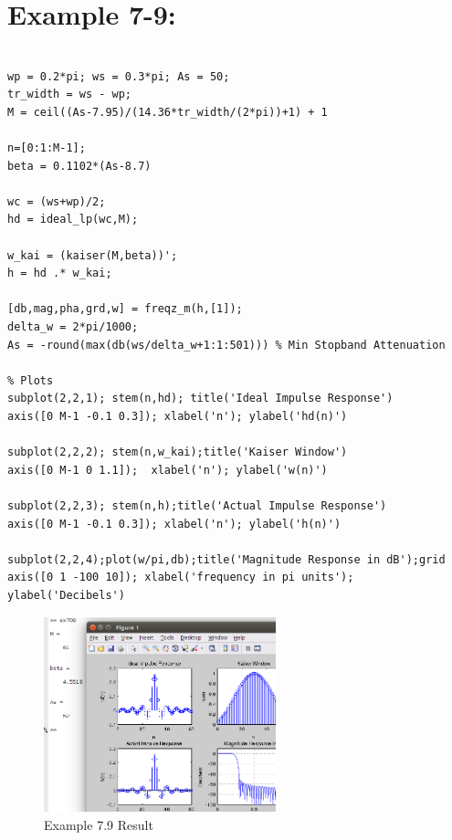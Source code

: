 \documentclass[11pt
  , a4paper
  , article
  , oneside
]{memoir}
\begin{document}
\chapter{Example 7-9:}
\begin{lstlisting}[style=termstyle]
% Example 7.9

wp = 0.2*pi; ws = 0.3*pi; As = 50;
tr_width = ws - wp;
M = ceil((As-7.95)/(14.36*tr_width/(2*pi))+1) + 1

n=[0:1:M-1];
beta = 0.1102*(As-8.7)

wc = (ws+wp)/2;
hd = ideal_lp(wc,M);

w_kai = (kaiser(M,beta))';
h = hd .* w_kai;

[db,mag,pha,grd,w] = freqz_m(h,[1]);
delta_w = 2*pi/1000;
As = -round(max(db(ws/delta_w+1:1:501))) % Min Stopband Attenuation

% Plots
subplot(2,2,1); stem(n,hd); title('Ideal Impulse Response')
axis([0 M-1 -0.1 0.3]); xlabel('n'); ylabel('hd(n)')

subplot(2,2,2); stem(n,w_kai);title('Kaiser Window')
axis([0 M-1 0 1.1]);  xlabel('n'); ylabel('w(n)')

subplot(2,2,3); stem(n,h);title('Actual Impulse Response')
axis([0 M-1 -0.1 0.3]); xlabel('n'); ylabel('h(n)')

subplot(2,2,4);plot(w/pi,db);title('Magnitude Response in dB');grid
axis([0 1 -100 10]); xlabel('frequency in pi units'); ylabel('Decibels')
\end{lstlisting}

\begin{figure}[h!]
	\centering
	\includegraphics[width=0.6\textwidth,height=0.4\textwidth]{./images/ex709.png}
	\caption{Example 7.9 Result}
	\label{fig:Example 7.9 Result}
\end{figure}

\clearpage
\end{document}
